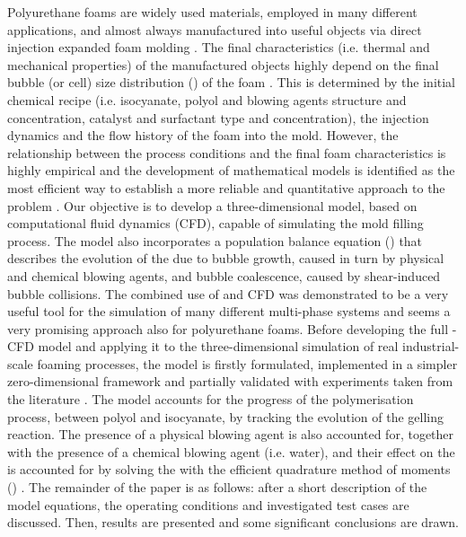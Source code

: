 Polyurethane foams are widely used materials, employed in many different
applications, and almost always manufactured into useful objects via direct
injection expanded foam molding
\cite{woods_1990,oertel_and_abele_1994,klempner_and_frisch_1991}.  The final
characteristics (i.e. thermal and mechanical properties) of the manufactured
objects highly depend on the final bubble (or cell) size distribution
({\BubbleSizeDistribution}) of the foam \cite{gibson_and_ashby_1999}.  This is
determined by the initial chemical recipe (i.e. isocyanate, polyol and blowing
agents structure and concentration, catalyst and surfactant type and
concentration), the injection dynamics and the flow history of the foam into the
mold.  However, the relationship between the process conditions and the final
foam characteristics is highly empirical and the development of mathematical
models is identified as the most efficient way to establish a more reliable and
quantitative approach to the problem
\cite{niyogi_and_kumar_etal_2014,beverte_2014,shen_and_zaho_etal_2014,zhao_and_gordon_etal_2013,mosanenzadeh_and_naguib_etal_2013,zhou_and_huang_etal_2006,tesser_and_deserio_etal_2004,lo_and_reible_etal_1994}.
Our objective is to develop a three-dimensional model, based on computational
fluid dynamics (CFD), capable of simulating the mold filling process.  The model
also incorporates a population balance equation ({\PopulationBalanceEquation})
that describes the evolution of the {\BubbleSizeDistribution} due to bubble
growth, caused in turn by physical and chemical blowing agents, and bubble
coalescence, caused by shear-induced bubble collisions.  The combined use of
{\PopulationBalanceEquation} and CFD was demonstrated to be a very useful tool
for the simulation of many different multi-phase systems
\cite{marchisio_and_fox_2013} and seems a very promising approach also for
polyurethane foams.  Before developing the full {\PopulationBalanceEquation}-CFD
model and applying it to the three-dimensional simulation of real
industrial-scale foaming processes, the {\PopulationBalanceEquation} model is
firstly formulated, implemented in a simpler zero-dimensional framework and
partially validated with experiments taken from the literature
\cite{baser_and_khakhar_1994_a,baser_and_khakhar_1994_b,greier_and_piesche_etal_2009}.
The model accounts for the progress of the polymerisation process, between
polyol and isocyanate, by tracking the evolution of the gelling reaction.  The
presence of a physical blowing agent is also accounted for, together with the
presence of a chemical blowing agent (i.e. water), and their effect on the
{\BubbleSizeDistribution} is accounted for by solving the
{\PopulationBalanceEquation} with the efficient quadrature method of moments
({\QuadratureMethodOfMoments}) \cite{marchisio_and_fox_2013}.  The remainder of
the paper is as follows: after a short description of the model equations, the
operating conditions and investigated test cases are discussed.  Then, results
are presented and some significant conclusions are drawn.
